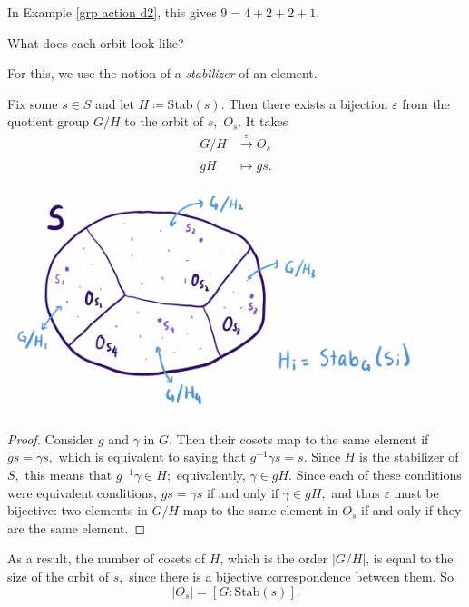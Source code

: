 In Example \ref{grp action d2}, this gives $9 = 4 + 2 + 2 + 1.$

\begin{qq}
What does each orbit look like?
\end{qq}

For this, we use the notion of a \emph{stabilizer} of an element.

\begin{proposition}
Fix some $s \in S$ and let $H \coloneqq \text{Stab}(s).$ Then there exists a bijection $\varepsilon$ from the quotient group $G/H$ to the orbit of $s,$ $O_s.$ It takes 
\begin{align*}
    G/H &\xrightarrow[]{\varepsilon} O_s \\
    gH &\mapsto gs.
\end{align*}
\end{proposition}

\begin{center}
    \includegraphics[width=12cm]{Lecture Files and Images/lec17-drawing.png}
\end{center}


\begin{proof}
Consider $g$ and $\gamma$ in $G.$ Then their cosets map to the same element if $gs = \gamma s,$ which is equivalent to saying that $g^{-1}\gamma s = s$. Since $H$ is the stabilizer of $S,$ this means that $g^{-1}\gamma \in H;$ equivalently, $\gamma \in gH.$ Since each of these conditions were equivalent conditions, $gs = \gamma s$ if and only if $\gamma \in gH,$ and thus $\varepsilon$ must be bijective: two elements in $G/H$ map to the same element in $O_s$ if and only if they are the same element.
\end{proof}

\begin{corollary}
As a result, the number of cosets of $H$, which is the order $|G/H|$, is equal to the size of the orbit of $s,$ since there is a bijective correspondence between them. So 
\[
|O_s| = [G : \text{Stab}(s)].
\]
\end{corollary}

